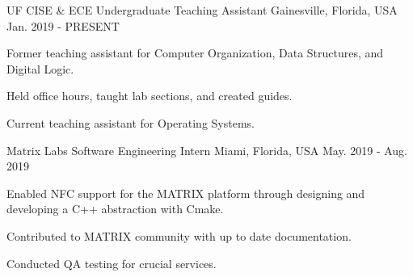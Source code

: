
\begin{cventries}

  \cventry
    {UF CISE \& ECE} %
    {Undergraduate Teaching Assistant} %
    {Gainesville, Florida, USA} %
    {Jan. 2019 - PRESENT} %
    {
      \begin{cvitems} %
        \item {Former teaching assistant for Computer Organization, Data Structures, and Digital Logic.}
        \item {Held office hours, taught lab sections, and created guides.}
        \item {Current teaching assistant for Operating Systems.}
      \end{cvitems}
    }


  \cventry
    {Matrix Labs} %
    {Software Engineering Intern} %
    {Miami, Florida, USA} %
    {May. 2019 - Aug. 2019} %
    {
      \begin{cvitems} %
        \item {Enabled NFC support for the MATRIX platform through designing and developing a C++ abstraction with Cmake.}
        \item {Contributed to MATRIX community with up to date documentation.}
        \item {Conducted QA testing for crucial services.}
      \end{cvitems}
    }



\end{cventries}
